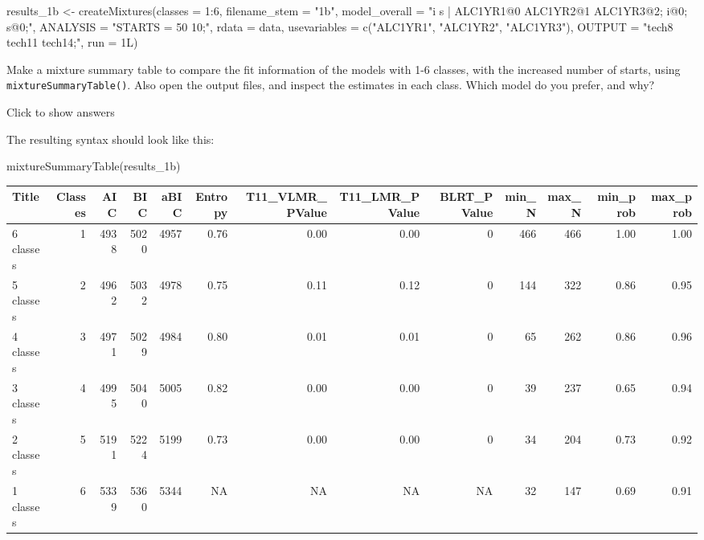 \documentclass[
]{book}
\newenvironment{Shaded}{\begin{snugshade}}{\end{snugshade}}
\newcommand{\AttributeTok}[1]{\textcolor[rgb]{0.77,0.63,0.00}{#1}}
\newcommand{\DecValTok}[1]{\textcolor[rgb]{0.00,0.00,0.81}{#1}}
\newcommand{\FunctionTok}[1]{\textcolor[rgb]{0.00,0.00,0.00}{#1}}
\newcommand{\NormalTok}[1]{#1}
\newcommand{\OtherTok}[1]{\textcolor[rgb]{0.56,0.35,0.01}{#1}}
\newcommand{\SpecialCharTok}[1]{\textcolor[rgb]{0.00,0.00,0.00}{#1}}
\newcommand{\StringTok}[1]{\textcolor[rgb]{0.31,0.60,0.02}{#1}}
\begin{document}
\begin{Shaded}
\begin{Highlighting}[]
\NormalTok{results\_1b }\OtherTok{\textless{}{-}} 
  \FunctionTok{createMixtures}\NormalTok{(}\AttributeTok{classes =} \DecValTok{1}\SpecialCharTok{:}\DecValTok{6}\NormalTok{,}
                 \AttributeTok{filename\_stem =} \StringTok{"1b"}\NormalTok{,}
                 \AttributeTok{model\_overall =} \StringTok{"i s | ALC1YR1@0 ALC1YR2@1 ALC1YR3@2;}
\StringTok{                                  i@0;  s@0;"}\NormalTok{,}
                 \AttributeTok{ANALYSIS =} \StringTok{"STARTS = 50 10;"}\NormalTok{,}
                 \AttributeTok{rdata =}\NormalTok{ data, }
                 \AttributeTok{usevariables =} \FunctionTok{c}\NormalTok{(}\StringTok{"ALC1YR1"}\NormalTok{, }\StringTok{"ALC1YR2"}\NormalTok{, }\StringTok{"ALC1YR3"}\NormalTok{),}
                 \AttributeTok{OUTPUT =} \StringTok{"tech8 tech11 tech14;"}\NormalTok{,}
                 \AttributeTok{run =}\NormalTok{ 1L)}
\end{Highlighting}
\end{Shaded}

Make a mixture summary table to compare the fit information of the models with 1-6 classes, with the increased number of starts, using \texttt{mixtureSummaryTable()}. Also open the output files, and inspect the estimates in each class. Which model do you prefer, and why?

Click to show answers

The resulting syntax should look like this:

\begin{Shaded}
\begin{Highlighting}[]
\FunctionTok{mixtureSummaryTable}\NormalTok{(results\_1b)}
\end{Highlighting}
\end{Shaded}

\begin{tabular}[t]{l|r|r|r|r|r|r|r|r|r|r|r|r}
\hline
Title & Classes & AIC & BIC & aBIC & Entropy & T11\_VLMR\_PValue & T11\_LMR\_PValue & BLRT\_PValue & min\_N & max\_N & min\_prob & max\_prob\\
\hline
6 classes & 1 & 4938 & 5020 & 4957 & 0.76 & 0.00 & 0.00 & 0 & 466 & 466 & 1.00 & 1.00\\
\hline
5 classes & 2 & 4962 & 5032 & 4978 & 0.75 & 0.11 & 0.12 & 0 & 144 & 322 & 0.86 & 0.95\\
\hline
4 classes & 3 & 4971 & 5029 & 4984 & 0.80 & 0.01 & 0.01 & 0 & 65 & 262 & 0.86 & 0.96\\
\hline
3 classes & 4 & 4995 & 5040 & 5005 & 0.82 & 0.00 & 0.00 & 0 & 39 & 237 & 0.65 & 0.94\\
\hline
2 classes & 5 & 5191 & 5224 & 5199 & 0.73 & 0.00 & 0.00 & 0 & 34 & 204 & 0.73 & 0.92\\
\hline
1 classes & 6 & 5339 & 5360 & 5344 & NA & NA & NA & NA & 32 & 147 & 0.69 & 0.91\\
\hline
\end{tabular}
\end{document}
